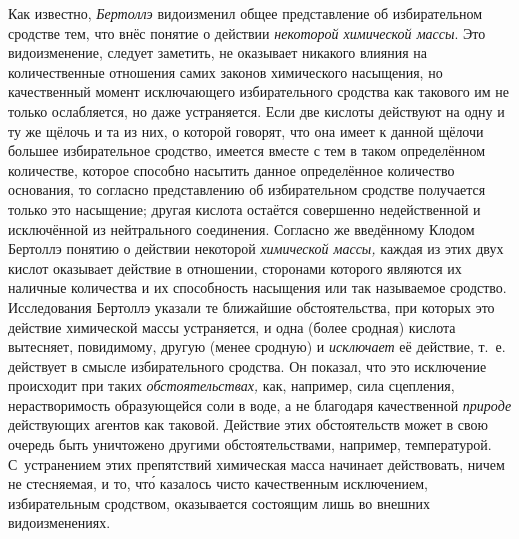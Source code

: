 Как известно, {\em Бертоллэ} видоизменил общее представление об избирательном
сродстве тем, что внёс понятие о действии {\em некоторой химической массы}. Это
видоизменение, следует заметить, не оказывает никакого влияния на
количественные отношения самих законов химического насыщения, но качественный
момент исключающего избирательного сродства как такового им не только
ослабляется, но даже устраняется. Если две кислоты действуют на одну и ту же
щёлочь и та из них, о которой говорят, что она имеет к данной щёлочи большее
избирательное сродство, имеется вместе с тем в таком определённом количестве,
которое способно насытить данное определённое количество основания, то согласно
представлению об избирательном сродстве получается только это насыщение; другая кислота
остаётся совершенно недейственной и исключённой из нейтрального соединения.
Согласно же введённому Клодом Бертоллэ понятию о действии некоторой
{\em химической массы,} каждая из этих двух кислот оказывает действие в
отношении, сторонами которого являются их наличные количества и их способность
насыщения или так называемое сродство. Исследования Бертоллэ указали те
ближайшие обстоятельства, при которых это действие химической массы
устраняется, и одна (более сродная) кислота вытесняет, повидимому, другую
(менее сродную) и {\em исключает} её действие, т.~е. действует в смысле
избирательного сродства. Он показал, что это исключение происходит при таких
{\em обстоятельствах,} как, например, сила сцепления, нерастворимость
образующейся соли в воде, а не благодаря качественной {\em природе} действующих
агентов как таковой. Действие этих обстоятельств может в свою очередь быть
уничтожено другими обстоятельствами, например, температурой. С~устранением этих
препятствий химическая масса начинает действовать, ничем не стесняемая, и то,
чт\'{о} казалось чисто качественным исключением, избирательным сродством,
оказывается состоящим лишь во внешних видоизменениях.

